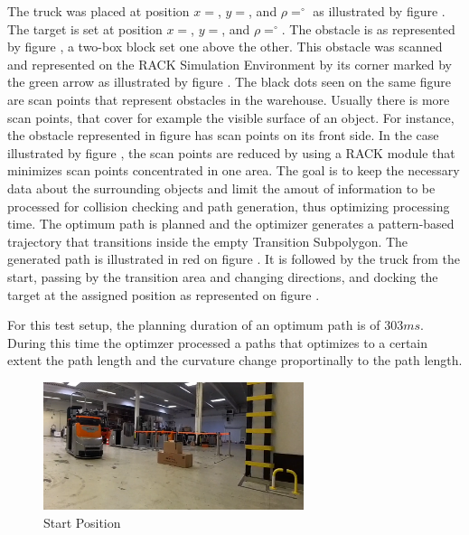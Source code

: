 The truck was placed at position \(x = \), \(y = \), and \(\rho = ^\circ\) as illustrated by figure 
. The target is set at position \(x = \), \(y = \), and \(\rho = ^\circ\).
The obstacle is as represented by figure , a two-box block set one above the other. 
This obstacle was scanned and represented on the RACK Simulation 
Environment by its corner marked by the green arrow as illustrated by figure .
The black dots seen on the same figure are scan points that represent obstacles in the warehouse. 
Usually there is more scan points, that cover for example the visible surface of an object.
For instance, the obstacle represented in figure  has scan points on its front side.
In the case illustrated by figure , the scan points are reduced by using a RACK module 
that minimizes scan points concentrated in one area. The goal is to keep the necessary data about the surrounding 
objects and limit the amout of information to be processed 
for collision checking and path generation, thus optimizing processing time.
The optimum path is planned and the optimizer generates a pattern-based trajectory that transitions
inside the empty Transition Subpolygon. 
The generated path is illustrated in red on figure . It is followed 
by the truck from the start, passing by the transition area and changing directions, and docking the 
target at the assigned position as represented on figure . 

For this test setup, the planning duration of an optimum path is of \(303ms\). During this time
the optimzer processed a paths that optimizes to a certain extent the path length and 
the curvature change proportinally to the path length.


\begin{figure}[H]
    \begin{center}
        \includegraphics[width=3in]{images/Chap3/Test2_ObsLeftVehic/Start_real.png} %
        \caption{Start Position}
        \label{OptResult12}
        \end{center}    
\end{figure}

